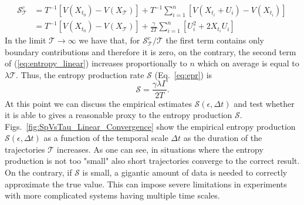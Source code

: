 \documentclass[12pt]{iopart}
\newcommand{\lx} {\left}
\newcommand{\rx} {\right}
\newcommand{\cP} {\mathcal{P}}
\newcommand{\cS} {\mathcal{S}}
\newcommand{\cT} {\mathcal{T}}
\begin{document}
\begin{align}
   \cS_\cT^{c}&=T^{-1}\lx[V(X_{t_{0}})-V(X_{\cT})\rx] +T^{-1}\sum_{i=1}^n\lx[V(X_{t_{i}}+U_i)-V(X_{t_i})\rx]\,\nonumber \\
   &=T^{-1}\lx[V(X_{t_{0}})-V(X_{\cT})\rx]+\frac{\gamma}{2T}\sum_{i=1}^n\lx[U_i^2+2X_{t_i}U_i\rx]
   \label{eq:entropy_linear}
\end{align}
In the limit $\cT \to \infty$ we have that, for $\cS_\cT^{c}/\cT$ the first term contains only boundary contributions and therefore it is zero, on the contrary, the second term of (\ref{eq:entropy_linear}) increases proportionally to $n$ which on average is equal to $\lambda \cT$. Thus, the entropy production rate $\cS$ (Eq.~\ref{eq:epr}) is
\begin{equation}
\cS=\frac{\gamma\lambda\Gamma}{2T}.
\end{equation}
At this point we can discuss the empirical estimates $\cS(\epsilon,\Delta t)$ and test whether it is able to gives a reasonable proxy to the entropy production $\cS$. Figs.~\ref{fig:SpVsTau_Linear_Convergence} show the empirical entropy production $\cS(\epsilon,\Delta t)$ as a function of the temporal scale $\Delta t$ as the duration of the trajectories $\cT$ increases. As one can see, in situations where the entropy production is not too "small" also short trajectories converge to the correct result. On the contrary, if $\cS$ is small, a gigantic amount of data is needed to correctly approximate the true value. This can impose severe limitations in experiments with more complicated systems having multiple time scales.
\end{document}
